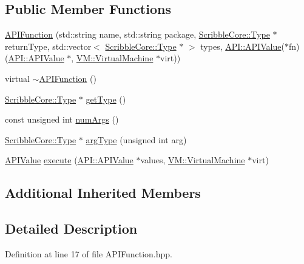 \subsection*{Public Member Functions}
\begin{DoxyCompactItemize}
\item 
\hyperlink{class_a_p_i_1_1_a_p_i_function_afea25b0659c827f353062798fb643e81}{A\-P\-I\-Function} (std\-::string name, std\-::string package, \hyperlink{class_scribble_core_1_1_type}{Scribble\-Core\-::\-Type} $\ast$return\-Type, std\-::vector$<$ \hyperlink{class_scribble_core_1_1_type}{Scribble\-Core\-::\-Type} $\ast$ $>$ types, \hyperlink{class_a_p_i_1_1_a_p_i_value}{A\-P\-I\-::\-A\-P\-I\-Value}($\ast$fn)(\hyperlink{class_a_p_i_1_1_a_p_i_value}{A\-P\-I\-::\-A\-P\-I\-Value} $\ast$, \hyperlink{class_v_m_1_1_virtual_machine}{V\-M\-::\-Virtual\-Machine} $\ast$virt))
\item 
virtual \hyperlink{class_a_p_i_1_1_a_p_i_function_a2dc447ed768ed299cd18b6f3226a2484}{$\sim$\-A\-P\-I\-Function} ()
\item 
\hyperlink{class_scribble_core_1_1_type}{Scribble\-Core\-::\-Type} $\ast$ \hyperlink{class_a_p_i_1_1_a_p_i_function_a7b3106c0510d471df41eb8e972205585}{get\-Type} ()
\item 
const unsigned int \hyperlink{class_a_p_i_1_1_a_p_i_function_a6544abd1ce33a241c71de9bad62547ab}{num\-Args} ()
\item 
\hyperlink{class_scribble_core_1_1_type}{Scribble\-Core\-::\-Type} $\ast$ \hyperlink{class_a_p_i_1_1_a_p_i_function_a086936a84a8c7b0490fee3f8c303435b}{arg\-Type} (unsigned int arg)
\item 
\hyperlink{class_a_p_i_1_1_a_p_i_value}{A\-P\-I\-Value} \hyperlink{class_a_p_i_1_1_a_p_i_function_a077954335c03ec3ebcc31aa746c9026a}{execute} (\hyperlink{class_a_p_i_1_1_a_p_i_value}{A\-P\-I\-::\-A\-P\-I\-Value} $\ast$values, \hyperlink{class_v_m_1_1_virtual_machine}{V\-M\-::\-Virtual\-Machine} $\ast$virt)
\end{DoxyCompactItemize}
\subsection*{Additional Inherited Members}


\subsection{Detailed Description}


Definition at line 17 of file A\-P\-I\-Function.\-hpp.



